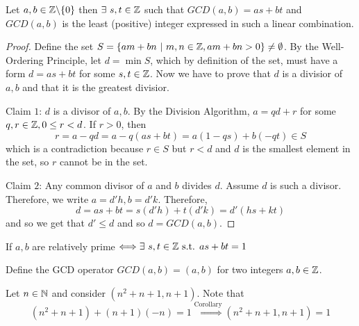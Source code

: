 \documentclass[12pt]{scrartcl}
\begin{document}
\begin{lemma}
  Let $a, b \in \mathbb Z \backslash \{0\}$ then $\exists \ s, t \in \mathbb Z$ such that $GCD(a, b) = as + bt$
  and $GCD(a, b)$ is the least (positive) integer expressed in such a linear combination.

  \begin{proof}
    
    \hfill

    Define the set $S = \{am + bn \ | \ m, n \in \mathbb Z, am + bn > 0\} \neq \emptyset$. By the 
    Well-Ordering Principle, let $d = \min S$, which by definition of the set, must have a form 
    $d = as + bt$ for some $s, t \in \mathbb Z$. Now we have to prove that $d$ is a divisior of $a, b$ and that 
    it is the greatest divisior.

    Claim $1$: $d$ is a divisor of $a, b$. By the Division Algorithm, $a = qd + r$ for some $q, r \in \mathbb Z, 0 \leq r < d$.
    If $r > 0$, then
    \[r = a - qd = a - q(as + bt) = a(1-qs) + b(-qt) \in S\]
    which is a contradiction because $r \in S$ but $r < d$ and $d$ is the smallest element in the set, so $r$ cannot be in the set. 
    
    Claim $2$: Any common divisor of $a$ and $b$ divides $d$. Assume $d$ is such a divisor. Therefore, 
    we write $a = d' h, b = d'k$. Therefore, 
    \[d = as + bt = s(d'h) + t(d'k) = d'(hs + kt)\]
    and so we get that $d' \leq d$ and so $d = GCD(a, b)$. 

  \end{proof}
\end{lemma}

\begin{corollary}
  If $a, b$ are relatively prime $\Longleftrightarrow \exists \ s, t \in \mathbb Z \text{ s.t. } as + bt = 1$
\end{corollary}

\begin{note}
  Define the GCD operator $GCD(a, b) = (a, b)$ for two integers $a, b \in \mathbb Z$.
\end{note}

\begin{example}
  Let $n \in \mathbb N$ and consider $(n^2 + n + 1, n + 1)$. Note that 
  \[(n^2 + n + 1) + (n + 1)(-n) = 1 \overset{\text{Corollary}}{\Longrightarrow} (n^2 + n + 1, n + 1) = 1\]
\end{example}
\end{document}
